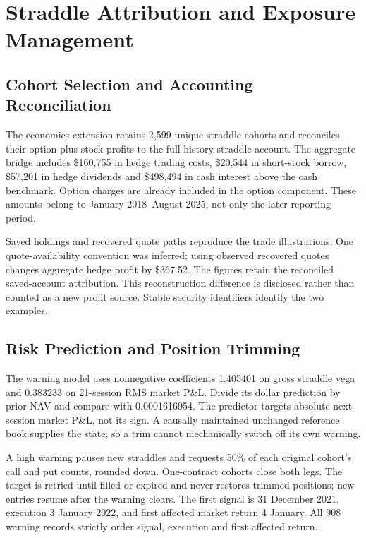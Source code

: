 \clearpage

\section{Straddle Attribution and Exposure Management}\label{app:f}

\subsection*{Cohort Selection and Accounting Reconciliation}

The economics extension retains 2,599 unique straddle cohorts and reconciles their option-plus-stock profits to the full-history straddle account. The aggregate bridge includes \$160,755 in hedge trading costs, \$20,544 in short-stock borrow, \$57,201 in hedge dividends and \$498,494 in cash interest above the cash benchmark. Option charges are already included in the option component. These amounts belong to January 2018--August 2025, not only the later reporting period.


Saved holdings and recovered quote paths reproduce the trade illustrations. One quote-availability convention was inferred; using observed recovered quotes changes aggregate hedge profit by \$367.52. The figures retain the reconciled saved-account attribution. This reconstruction difference is disclosed rather than counted as a new profit source. Stable security identifiers identify the two examples.


\subsection*{Risk Prediction and Position Trimming}

The warning model uses nonnegative coefficients 1.405401 on gross straddle vega and 0.383233 on 21-session RMS market P\&L. Divide its dollar prediction by prior NAV and compare with 0.0001616954. The predictor targets absolute next-session market P\&L, not its sign. A causally maintained unchanged reference book supplies the state, so a trim cannot mechanically switch off its own warning.


A high warning pauses new straddles and requests 50\% of each original cohort's call and put counts, rounded down. One-contract cohorts close both legs. The target is retried until filled or expired and never restores trimmed positions; new entries resume after the warning clears. The first signal is 31 December 2021, execution 3 January 2022, and first affected market return 4 January. All 908 warning records strictly order signal, execution and first affected return.


